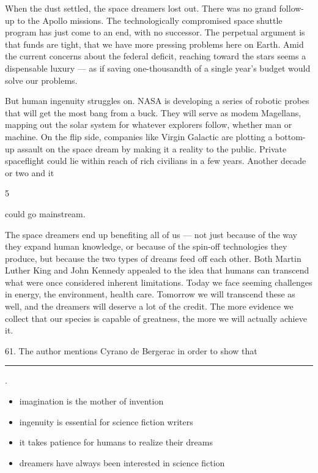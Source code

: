 \documentclass[UTF8,11pt]{ctexart}
\begin{document}
When the dust settled, the space dreamers lost out. There was no grand follow-up to the Apollo missions. The technologically compromised space shuttle program has just come to an end, with no successor. The perpetual argument is that funds are tight, that we have more pressing problems here on Earth. Amid the current concerns about the federal deficit, reaching toward the stars seems a dispensable luxury — as if saving one-thousandth of a single year’s budget would solve our problems.


But human ingenuity struggles on. NASA is developing a series of robotic probes that will get the most bang from a buck. They will serve as modem Magellans, mapping out the solar system for whatever explorers follow, whether man or machine. On the flip side, companies like Virgin Galactic are plotting a bottom-up assault on the space dream by making it a reality to the public. Private spaceflight could lie within reach of rich civilians in a few years. Another decade or two and it


5


could go mainstream.


The space dreamers end up benefiting all of us — not just because of the way they expand human knowledge, or because of the spin-off technologies they produce, but because the two types of dreams feed off each other. Both Martin Luther King and John Kennedy appealed to the idea that humans can transcend what were once considered inherent limitations. Today we face seeming challenges in energy, the environment, health care. Tomorrow we will transcend these as well, and the dreamers will deserve a lot of the credit. The more evidence we collect that our species is capable of greatness, the more we will actually achieve it.


61. The author mentions Cyrano de Bergerac in order to show that\par\noindent\rule{.95\linewidth}{.4pt}\par  .


\begin{itemize}[leftmargin=2em,itemsep=.2em,topsep=.4em]\item[A.] imagination is the mother of invention
\item[B.] ingenuity is essential for science fiction writers
\item[C.] it takes patience for humans to realize their dreams
\item[D.] dreamers have always been interested in science fiction
\end{itemize}
\end{document}
